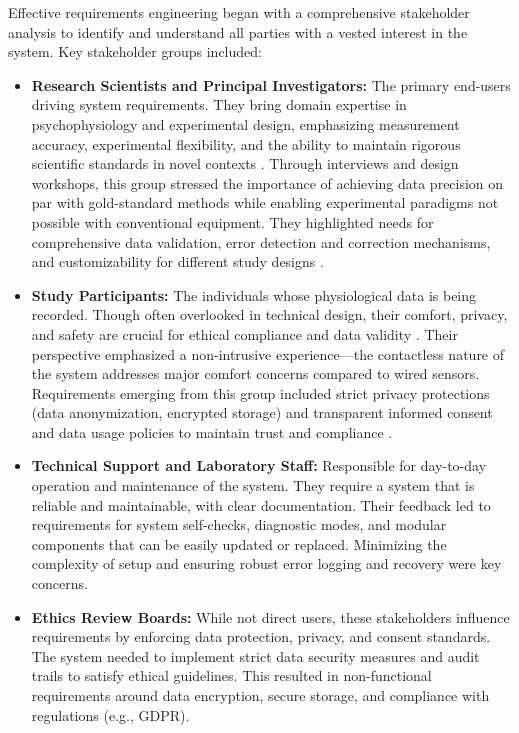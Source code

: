 \documentclass[11pt,a4paper]{report}
\begin{document}
Effective requirements engineering began with a comprehensive stakeholder analysis to identify and understand all parties with a vested interest in the system. Key stakeholder groups included:
\begin{itemize}
\item \textbf{Research Scientists and Principal Investigators:} The primary end-users driving system requirements. They bring domain expertise in psychophysiology and experimental design, emphasizing measurement accuracy, experimental flexibility, and the ability to maintain rigorous scientific standards in novel contexts \cite{Cacioppo1990PhysSig}. Through interviews and design workshops, this group stressed the importance of achieving data precision on par with gold-standard methods while enabling experimental paradigms not possible with conventional equipment. They highlighted needs for comprehensive data validation, error detection and correction mechanisms, and customizability for different study designs \cite{Levenson2003AutonomicEmotion}.
\item \textbf{Study Participants:} The individuals whose physiological data is being recorded. Though often overlooked in technical design, their comfort, privacy, and safety are crucial for ethical compliance and data validity \cite{Emanuel2000EthicalResearch}. Their perspective emphasized a non-intrusive experience---the contactless nature of the system addresses major comfort concerns compared to wired sensors. Requirements emerging from this group included strict privacy protections (data anonymization, encrypted storage) and transparent informed consent and data usage policies to maintain trust and compliance \cite{Beauchamp2001Bioethics}.
\item \textbf{Technical Support and Laboratory Staff:} Responsible for day-to-day operation and maintenance of the system. They require a system that is reliable and maintainable, with clear documentation. Their feedback led to requirements for system self-checks, diagnostic modes, and modular components that can be easily updated or replaced. Minimizing the complexity of setup and ensuring robust error logging and recovery were key concerns.
\item \textbf{Ethics Review Boards:} While not direct users, these stakeholders influence requirements by enforcing data protection, privacy, and consent standards. The system needed to implement strict data security measures and audit trails to satisfy ethical guidelines. This resulted in non-functional requirements around data encryption, secure storage, and compliance with regulations (e.g., GDPR).

\end{itemize}
\end{document}
